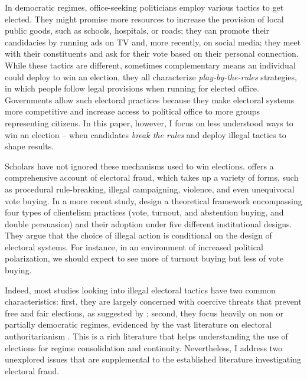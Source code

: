\documentclass[11pt]{article}
\begin{document}
In democratic regimes, office-seeking politicians employ various tactics to get elected. They might promise more resources to increase the provision of local public goods, such as schools, hospitals, or roads; they can promote their candidacies by running ads on TV and, more recently, on social media; they meet with their constituents and ask for their vote based on their personal connection. While these tactics are different, sometimes complementary means an individual could deploy to win an election, they all characterize \emph{play-by-the-rules} strategies, in which people follow legal provisions when running for elected office. Governments allow such electoral practices because they make electoral systems more competitive and increase access to political office to more groups representing citizens. In this paper, however, I focus on less understood ways to win an election -- when candidates \emph{break the rules} and deploy illegal tactics to shape results.

Scholars have not ignored these mechanisms used to win elections. \citet{LehoucqElectoralFraudCauses2003} offers a comprehensive account of electoral fraud, which takes up a variety of forms, such as procedural rule-breaking, illegal campaigning, violence, and even unequivocal vote buying. In a more recent study, \citet{Gans-MorseVarietiesClientelismMachine2013a} design a theoretical framework encompassing four types of clientelism practices (vote, turnout, and abstention buying, and double persuasion) and their adoption under five different institutional designs. They argue that the choice of illegal action is conditional on the design of electoral systems. For instance, in an environment of increased political polarization, we should expect to see more of turnout buying but less of vote buying.

Indeed, most studies looking into illegal electoral tactics have two common characteristics: first, they are largely concerned with coercive threats that prevent free and fair elections, as suggested by \citet{MaresBuyingExpropriatingStealing2016}; second, they focus heavily on non or partially democratic regimes, evidenced by the vast literature on electoral authoritarianism \citep{LevitskyRiseCompetitiveAuthoritarianism2002,GandhiElectionsAuthoritarianism2009,IchinoDeterringDisplacingElectoral2012,SchedlerElectoralAuthoritarianism2015,AsunkaElectoralFraudViolence2017a}. This is a rich literature that helps understanding the use of elections for regime consolidation and continuity. Nevertheless, I address two unexplored issues that are supplemental to the established literature investigating electoral fraud.
\end{document}
